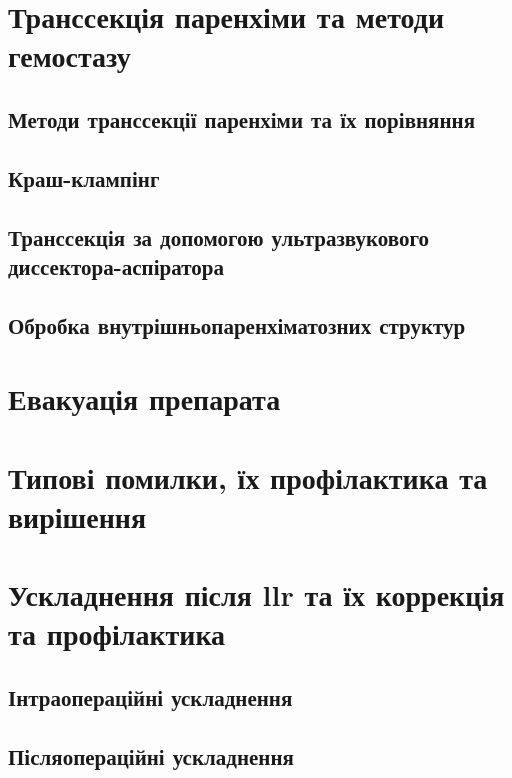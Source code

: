 \begin{refsection}
\section{Транссекція паренхіми та методи гемостазу}

\subsection{Методи транссекції паренхіми та їх порівняння}

\subsection{Краш-клампінг}

\subsection{Транссекція за допомогою ультразвукового диссектора-аспіратора}

\subsection{Обробка внутрішньопаренхіматозних структур}

\section{Евакуація препарата}

\section{Типові помилки, їх профілактика та вирішення}

\section{Ускладнення після \acrshort{llr} та їх коррекція та профілактика}

\subsection{Інтраопераційні ускладнення}

\subsection{Післяопераційні ускладнення}


\printbibliography [heading=subbibliography]
\end{refsection}